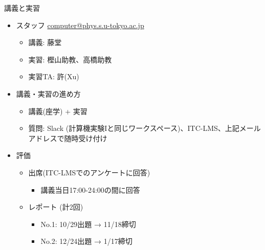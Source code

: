 \begin{frame}[t,fragile]{講義と実習}
  \begin{itemize}
  \item スタッフ \href{mailto:computer@phys.s.u-tokyo.ac.jp}{computer@phys.s.u-tokyo.ac.jp}
    \begin{itemize}
    \item 講義: 藤堂
    \item 実習: 樫山助教、高橋助教
    \item 実習TA: 許(Xu)
    \end{itemize}
  \item 講義・実習の進め方
    \begin{itemize}
    \item 講義(座学) + 実習
    \item 質問: Slack (計算機実験Iと同じワークスペース)、ITC-LMS、上記メールアドレスで随時受け付け
    \end{itemize}
  \item 評価
    \begin{itemize}
    \item 出席(ITC-LMSでのアンケートに回答)
      \begin{itemize}
      \item 講義当日17:00-24:00の間に回答
      \end{itemize}
    \item レポート (計2回)
      \begin{itemize}
      \item No.1: 10/29出題 → 11/18締切 
      \item No.2: 12/24出題 → 1/17締切
      \end{itemize}
    \end{itemize}    
  \end{itemize}    
\end{frame}
